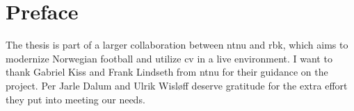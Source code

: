 \chapter*{Preface}

The thesis is part of a larger collaboration between \acrfull{ntnu} and \acrfull{rbk}, which aims to modernize Norwegian football and utilize \acrfull{cv} in a live environment. I want to thank Gabriel Kiss and Frank Lindseth from \acrshort{ntnu} for their guidance on the project. Per Jarle Dalum and Ulrik Wisløff deserve gratitude for the extra effort they put into meeting our needs.
